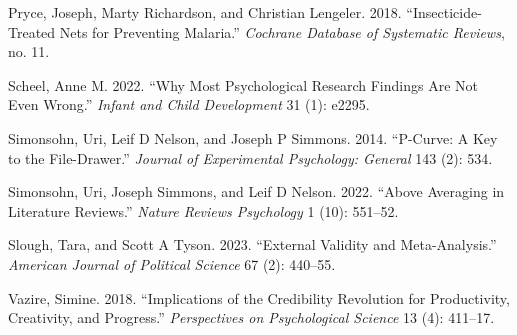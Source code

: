 \documentclass{article}
\newlength{\cslhangindent}
\newenvironment{CSLReferences}[2] %
 {\begin{list}{}{%
  \setlength{\itemindent}{0pt}
  \setlength{\leftmargin}{0pt}
  \setlength{\parsep}{0pt}
  \ifodd #1
   \setlength{\leftmargin}{\cslhangindent}
   \setlength{\itemindent}{-1\cslhangindent}
  \fi
  \setlength{\itemsep}{#2\baselineskip}}}
 {\end{list}}
\begin{document}
\begin{CSLReferences}{1}{0}
Pryce, Joseph, Marty Richardson, and Christian Lengeler. 2018.
{``Insecticide-Treated Nets for Preventing Malaria.''} \emph{Cochrane
Database of Systematic Reviews}, no. 11.

Scheel, Anne M. 2022. {``Why Most Psychological Research Findings Are
Not Even Wrong.''} \emph{Infant and Child Development} 31 (1): e2295.

Simonsohn, Uri, Leif D Nelson, and Joseph P Simmons. 2014. {``P-Curve: A
Key to the File-Drawer.''} \emph{Journal of Experimental Psychology:
General} 143 (2): 534.

Simonsohn, Uri, Joseph Simmons, and Leif D Nelson. 2022. {``Above
Averaging in Literature Reviews.''} \emph{Nature Reviews Psychology} 1
(10): 551--52.

Slough, Tara, and Scott A Tyson. 2023. {``External Validity and
Meta-Analysis.''} \emph{American Journal of Political Science} 67 (2):
440--55.

Vazire, Simine. 2018. {``Implications of the Credibility Revolution for
Productivity, Creativity, and Progress.''} \emph{Perspectives on
Psychological Science} 13 (4): 411--17.

\end{CSLReferences}



\end{document}
